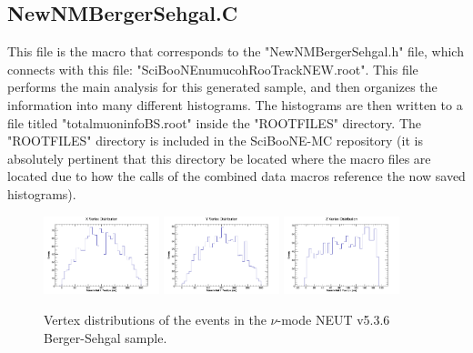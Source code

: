 \documentclass[11pt]{article}
\begin{document}
\subsection{NewNMBergerSehgal.C}
\label{sub:NewNMBergerSehgal.C}
This file is the macro that corresponds to the "NewNMBergerSehgal.h" file, which connects with this file: "SciBooNE\textunderscore numu\textunderscore coh\textunderscore RooTrack\textunderscore NEW.root". This file performs the main analysis for this generated sample, and then organizes the information into many different histograms. The histograms are then written to a file titled "totalmuoninfoBS.root" inside the "ROOTFILES" directory. The "ROOTFILES" directory is included in the SciBooNE-MC repository (it is absolutely pertinent that this directory be located where the macro files are located due to how the calls of the combined data macros reference the now saved histograms).

\begin{figure}[H]
\centering
\includegraphics[width=0.3\textwidth]{NewNMBergerSehgalImages/4-XVertexDistributionNMBS.png}
\includegraphics[width=0.3\textwidth]{NewNMBergerSehgalImages/3-YVertexDistributionNMBS.png}
\includegraphics[width=0.3\textwidth]{NewNMBergerSehgalImages/2-ZVertexDistributionNMBS.png}
\caption{Vertex distributions of the events in the $\nu$-mode NEUT v5.3.6 Berger-Sehgal sample.}
\label{fig:app:NMVertexDistributionBS}
\end{figure}
\end{document}

